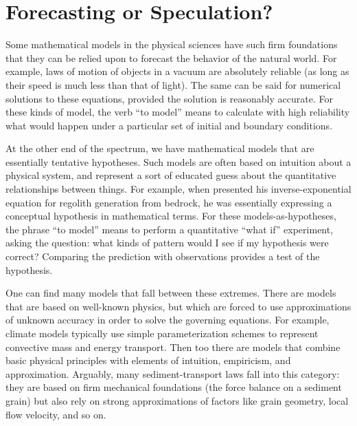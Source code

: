 \documentclass[12pt,reqno]{amsart}
\begin{document}
\section{Forecasting or Speculation?}

Some mathematical models in the physical sciences have such firm foundations that they can be relied upon to forecast the behavior of the natural world. For example, laws of motion of objects in a vacuum are absolutely reliable (as long as their speed is much less than that of light). The same can be said for numerical solutions to these equations, provided the solution is reasonably accurate. For these kinds of model, the verb ``to model'' means to calculate with high reliability what would happen under a particular set of initial and boundary conditions.

At the other end of the spectrum, we have mathematical models that are essentially tentative hypotheses. Such models are often based on intuition about a physical system, and represent a sort of educated guess about the quantitative relationships between things. For example, when \citet{ahnert1976} presented his inverse-exponential equation for regolith generation from bedrock, he was essentially expressing a conceptual hypothesis in mathematical terms. For these models-as-hypotheses, the phrase ``to model'' means to perform a quantitative ``what if'' experiment, asking the question: what kinds of pattern would I see if my hypothesis were correct? Comparing the prediction with observations provides a test of the hypothesis.

One can find many models that fall between these extremes. There are models that are based on well-known physics, but which are forced to use approximations of unknown accuracy in order to solve the governing equations. For example, climate models typically use simple parameterization schemes to represent convective mass and energy transport. Then too there are models that combine basic physical principles with elements of intuition, empiricism, and approximation. Arguably, many sediment-transport laws fall into this category: they are based on firm mechanical foundations (the force balance on a sediment grain) but also rely on strong approximations of factors like grain geometry, local flow velocity, and so on.
\end{document}
